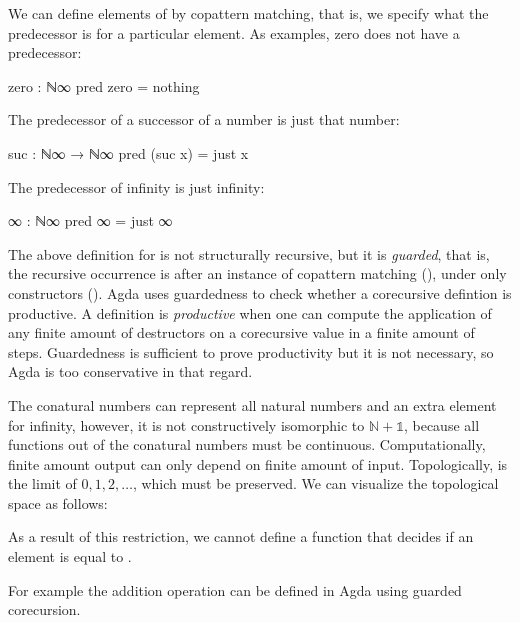 We can define elements of  by copattern matching, that is, we
specify what the predecessor is for a particular element. As examples, zero does
not have a predecessor:
\begin{code}
zero : ℕ∞
pred zero = nothing
\end{code}
The predecessor of a successor of a number is just that number:
\begin{code}
suc : ℕ∞ → ℕ∞
pred (suc x) = just x
\end{code}
The predecessor of infinity is just infinity:
\begin{code}
∞ : ℕ∞
pred ∞ = just ∞
\end{code}
The above definition for  is not structurally recursive, but it
is \emph{guarded}, that is, the recursive occurrence is after an instance of
copattern matching (), under only constructors
(). Agda uses guardedness to check whether a
corecursive defintion is productive. A definition is \emph{productive} when one
can compute the application of any finite amount of destructors on a corecursive
value in a finite amount of steps. Guardedness is sufficient to prove
productivity but it is not necessary, so Agda is too conservative in that
regard.

The conatural numbers can represent all natural numbers and an extra element for
infinity, however, it is not constructively isomorphic to $\mathbb{N} +
\mathbb{1}$, because all functions out of the conatural numbers must be
continuous. Computationally, finite amount output can only depend on finite
amount of input. Topologically,  is the limit of $0, 1, 2,
\dots$, which must be preserved. We can visualize the topological space as
follows:
\begin{center}
\end{center}
As a result of this restriction, we cannot define a function that decides if an
element is equal to .

For example the addition operation can be defined in Agda using guarded
corecursion.

